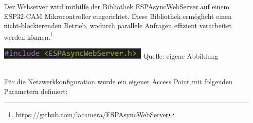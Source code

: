 \documentclass[ngerman,12pt,a4paper]{article}
\begin{document}
	Der Webserver wird mithilfe der Bibliothek ESPAsyncWebServer auf einem ESP32-CAM Mikrocontroller eingerichtet. Diese Bibliothek ermöglicht einen nicht-blockierenden Betrieb, wodurch parallele Anfragen effizient verarbeitet werden können.\footnote{https://github.com/lacamera/ESPAsyncWebServer} \\[0.5cm]
	\begin{minipage}{\textwidth}
		\centering
		\includegraphics[scale=1]{Pictures/espasyncwebserver}
		\label{fig:espasyncwebserver}
		\vspace{-2pt}
		\small Quelle: eigene Abbildung
	\end{minipage} \\[0.75cm]
	Für die Netzwerkkonfiguration wurde ein eigener Access Point mit folgenden Parametern definiert:
	
\end{document}

